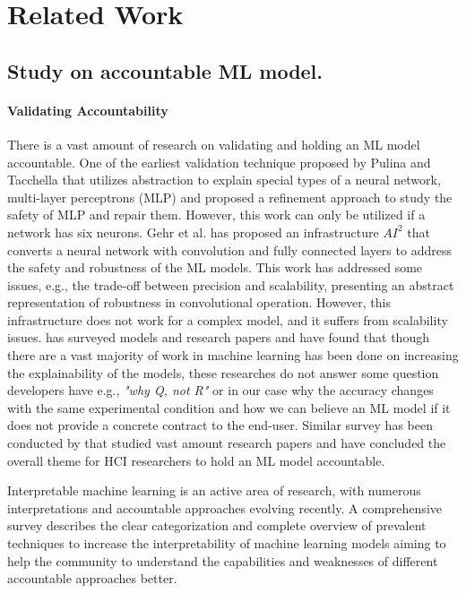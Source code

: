 \section{Related Work}
\label{sec:relatedwork}
\subsection{\textbf{Study on accountable ML model.}}
\paragraph{Validating Accountability}
There is a vast amount of research on validating and holding an ML model accountable. One of the earliest validation technique proposed by Pulina and Tacchella \cite{pulina2010abstraction} that utilizes abstraction to explain special types of a neural network, multi-layer perceptrons (MLP) and proposed a refinement approach to study the safety of MLP and repair them. However, this work can only be utilized if a network has six neurons. Gehr et al. \cite{gehr2018ai2} has proposed an infrastructure $AI^{2}$ that converts a neural network with convolution and fully connected layers to address the safety and robustness of the ML models. This work has addressed some issues, e.g., the trade-off between precision and scalability, presenting an abstract representation of robustness in convolutional operation. However, this infrastructure does not work for a complex model, and it suffers from scalability issues. \cite{du2018techniques} has surveyed models and research papers and have found that though there are a vast majority of work in machine learning has been done on increasing the explainability of the models, these researches do not answer some question developers have e.g., \emph{"why Q, not R"} or in our case why the accuracy changes with the same experimental condition and how we can believe an ML model if it does not provide a concrete contract to the end-user. Similar survey has been conducted by \cite{abdul2018trends} that studied vast amount research papers and have concluded the overall theme for HCI researchers to hold an ML model accountable.

Interpretable machine learning is an active area of research, with numerous interpretations and accountable approaches evolving recently. A comprehensive survey \cite{du2018techniques} describes the clear categorization and complete overview of prevalent techniques to increase the interpretability of machine learning models aiming to help the community to understand the capabilities and weaknesses of different accountable approaches better.


